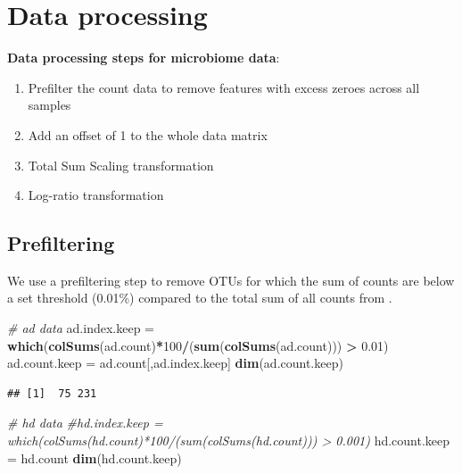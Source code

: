 \documentclass[]{book}
\newenvironment{Shaded}{\begin{snugshade}}{\end{snugshade}}
\newcommand{\KeywordTok}[1]{\textcolor[rgb]{0.13,0.29,0.53}{\textbf{#1}}}
\newcommand{\DecValTok}[1]{\textcolor[rgb]{0.00,0.00,0.81}{#1}}
\newcommand{\FloatTok}[1]{\textcolor[rgb]{0.00,0.00,0.81}{#1}}
\newcommand{\StringTok}[1]{\textcolor[rgb]{0.31,0.60,0.02}{#1}}
\newcommand{\CommentTok}[1]{\textcolor[rgb]{0.56,0.35,0.01}{\textit{#1}}}
\newcommand{\OperatorTok}[1]{\textcolor[rgb]{0.81,0.36,0.00}{\textbf{#1}}}
\newcommand{\NormalTok}[1]{#1}
\providecommand{\tightlist}{%
  \setlength{\itemsep}{0pt}\setlength{\parskip}{0pt}}
\begin{document}
\section{Data processing}\label{data-processing}

\textbf{Data processing steps for microbiome data}:

\begin{enumerate}
\def\labelenumi{\arabic{enumi}.}
\tightlist
\item
  Prefilter the count data to remove features with excess zeroes across
  all samples\\
\item
  Add an offset of 1 to the whole data matrix\\
\item
  Total Sum Scaling transformation\\
\item
  Log-ratio transformation
\end{enumerate}

\subsection{Prefiltering}\label{prefiltering}

We use a prefiltering step to remove OTUs for which the sum of counts
are below a set threshold (0.01\%) compared to the total sum of all
counts from \citep{arumugam2011enterotypes}.

\begin{Shaded}
\begin{Highlighting}[]
\CommentTok{# ad data}
\NormalTok{ad.index.keep =}\StringTok{ }\KeywordTok{which}\NormalTok{(}\KeywordTok{colSums}\NormalTok{(ad.count)}\OperatorTok{*}\DecValTok{100}\OperatorTok{/}\NormalTok{(}\KeywordTok{sum}\NormalTok{(}\KeywordTok{colSums}\NormalTok{(ad.count))) }\OperatorTok{>}\StringTok{ }\FloatTok{0.01}\NormalTok{)}
\NormalTok{ad.count.keep =}\StringTok{ }\NormalTok{ad.count[,ad.index.keep]}
\KeywordTok{dim}\NormalTok{(ad.count.keep)}
\end{Highlighting}
\end{Shaded}

\begin{verbatim}
## [1]  75 231
\end{verbatim}

\begin{Shaded}
\begin{Highlighting}[]
\CommentTok{# hd data}
\CommentTok{#hd.index.keep = which(colSums(hd.count)*100/(sum(colSums(hd.count))) > 0.001)}
\NormalTok{hd.count.keep =}\StringTok{ }\NormalTok{hd.count}
\KeywordTok{dim}\NormalTok{(hd.count.keep)}
\end{Highlighting}
\end{Shaded}
\end{document}
